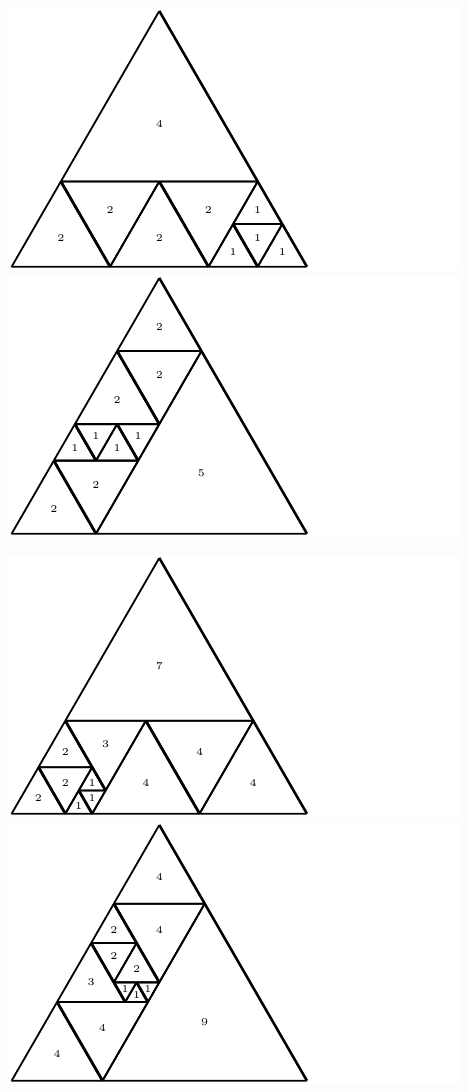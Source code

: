 \documentclass[12pt,amstags,fleqn]{article}
\theoremstyle{plain}
\theoremstyle{definition}
\begin{document}
\begin{center}
\includegraphics{max_relative_size_9.pdf}\includegraphics{max_relative_size_10.pdf}
\end{center}
\begin{center}
\includegraphics{max_relative_size_11.pdf}\includegraphics{max_relative_size_12.pdf}
\end{center}
\end{document}
